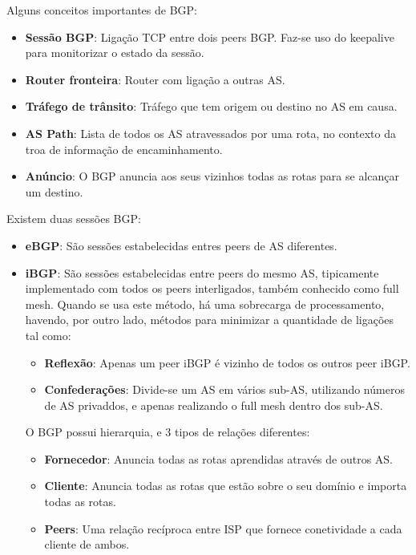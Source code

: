 \documentclass[11pt,english, openright, oneside]{book}
\begin{document}
\begin{itemize}
  Alguns conceitos importantes de BGP:
  \begin{itemize}
    \item \textbf{Sessão BGP}: Ligação TCP entre dois peers BGP. Faz-se uso do keepalive para monitorizar o estado da sessão. 
    \item \textbf{Router fronteira}: Router com ligação a outras AS.
    \item \textbf{Tráfego de trânsito}: Tráfego que tem origem ou destino no AS em causa.
    \item \textbf{AS Path}: Lista de todos os AS atravessados por uma rota, no contexto da troa de informação 
    de encaminhamento.
    \item \textbf{Anúncio}: O BGP anuncia aos seus vizinhos todas as rotas para se alcançar um destino.
  \end{itemize}
  \vspace{0.2cm}

  \newpage
  Existem duas sessões BGP:
  \begin{itemize}
    \item \textbf{eBGP}: São sessões estabelecidas entres peers de AS diferentes.
    \item \textbf{iBGP}: São sessões estabelecidas entre peers do mesmo AS, tipicamente implementado com todos os peers interligados, também conhecido como full mesh. Quando se usa este método, há uma sobrecarga de processamento, havendo, por outro lado, métodos para minimizar a quantidade de ligações tal como:
    \begin{itemize}
      \item \textbf{Reflexão}: Apenas um peer iBGP é vizinho de todos os outros peer iBGP.
      \item \textbf{Confederações}: Divide-se um AS em vários sub-AS, utilizando números de AS privaddos, e apenas realizando o full mesh dentro dos sub-AS. 
    \end{itemize}
  \vspace{0.2cm}
  
  O BGP possui hierarquia, e 3 tipos de relações diferentes:
  \begin{itemize}
    \item \textbf{Fornecedor}: Anuncia todas as rotas aprendidas através de outros AS.
    \item \textbf{Cliente}: Anuncia todas as rotas que estão sobre o seu domínio e importa todas as rotas.
    \item \textbf{Peers}: Uma relação recíproca entre ISP que fornece conetividade a cada cliente de ambos.
  \end{itemize}
  \vspace{0.2cm}


\end{itemize}
\end{itemize}
\end{document}
